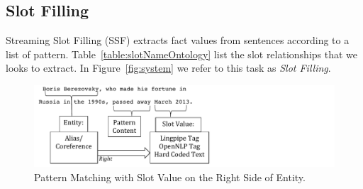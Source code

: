



\subsection{Slot Filling}
Streaming Slot Filling (SSF) extracts fact values from sentences according to a list of pattern.
Table~\ref{table:slotNameOntology} list the slot relationships that we looks to extract.
In Figure~\ref{fig:system} we refer to this task as \textit{Slot Filling}. 



\begin{figure}
\centering
\includegraphics[width = 13cm]{./images/Pattern-crop.pdf}
\vspace*{-.1in} \caption{Pattern Matching with Slot Value on the Right Side of Entity.}\label{fig:pattern}
\vspace*{-.2in}
\end{figure}


